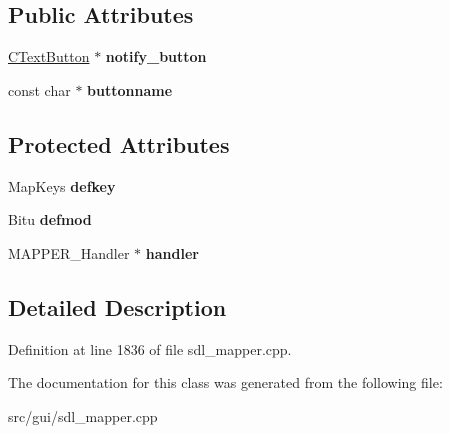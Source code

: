 \subsection*{Public Attributes}
\begin{DoxyCompactItemize}
\item 
\hypertarget{classCHandlerEvent_ac636235e80032332d688fe888ebd5cf4}{\hyperlink{classCTextButton}{C\-Text\-Button} $\ast$ {\bfseries notify\-\_\-button}}\label{classCHandlerEvent_ac636235e80032332d688fe888ebd5cf4}

\item 
\hypertarget{classCHandlerEvent_a935a8c622ac72d46512f5c88fefacda8}{const char $\ast$ {\bfseries buttonname}}\label{classCHandlerEvent_a935a8c622ac72d46512f5c88fefacda8}

\end{DoxyCompactItemize}
\subsection*{Protected Attributes}
\begin{DoxyCompactItemize}
\item 
\hypertarget{classCHandlerEvent_a7d53624253497b7dcad4a281a790333d}{Map\-Keys {\bfseries defkey}}\label{classCHandlerEvent_a7d53624253497b7dcad4a281a790333d}

\item 
\hypertarget{classCHandlerEvent_a2ebc8142a6ef34d7c23349e86a0d4486}{Bitu {\bfseries defmod}}\label{classCHandlerEvent_a2ebc8142a6ef34d7c23349e86a0d4486}

\item 
\hypertarget{classCHandlerEvent_a9227a65125fadc33d775cc0de3b29393}{M\-A\-P\-P\-E\-R\-\_\-\-Handler $\ast$ {\bfseries handler}}\label{classCHandlerEvent_a9227a65125fadc33d775cc0de3b29393}

\end{DoxyCompactItemize}


\subsection{Detailed Description}


Definition at line 1836 of file sdl\-\_\-mapper.\-cpp.



The documentation for this class was generated from the following file\-:\begin{DoxyCompactItemize}
\item 
src/gui/sdl\-\_\-mapper.\-cpp\end{DoxyCompactItemize}
